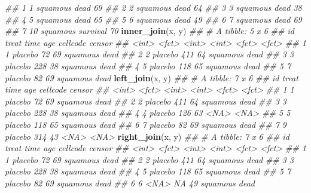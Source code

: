 \documentclass[
]{book}
\newenvironment{Shaded}{\begin{snugshade}}{\end{snugshade}}
\newcommand{\CommentTok}[1]{\textcolor[rgb]{0.56,0.35,0.01}{\textit{#1}}}
\newcommand{\KeywordTok}[1]{\textcolor[rgb]{0.13,0.29,0.53}{\textbf{#1}}}
\newcommand{\NormalTok}[1]{#1}
\begin{document}
\begin{Shaded}
\begin{Highlighting}[]
\CommentTok{\#\# 1     1 squamous dead        69}
\CommentTok{\#\# 2     2 squamous dead        64}
\CommentTok{\#\# 3     3 squamous dead        38}
\CommentTok{\#\# 4     5 squamous dead        65}
\CommentTok{\#\# 5     6 squamous dead        49}
\CommentTok{\#\# 6     7 squamous dead        69}
\CommentTok{\#\# 7    10 squamous survival    70}
\KeywordTok{inner\_join}\NormalTok{(x, y)}
\CommentTok{\#\# \# A tibble: 5 x 6}
\CommentTok{\#\#      id treat    time   age cellcode censor}
\CommentTok{\#\#   \textless{}int\textgreater{} \textless{}fct\textgreater{}   \textless{}int\textgreater{} \textless{}int\textgreater{} \textless{}fct\textgreater{}    \textless{}fct\textgreater{} }
\CommentTok{\#\# 1     1 placebo    72    69 squamous dead  }
\CommentTok{\#\# 2     2 placebo   411    64 squamous dead  }
\CommentTok{\#\# 3     3 placebo   228    38 squamous dead  }
\CommentTok{\#\# 4     5 placebo   118    65 squamous dead  }
\CommentTok{\#\# 5     7 placebo    82    69 squamous dead}
\KeywordTok{left\_join}\NormalTok{(x, y) }
\CommentTok{\#\# \# A tibble: 7 x 6}
\CommentTok{\#\#      id treat    time   age cellcode censor}
\CommentTok{\#\#   \textless{}int\textgreater{} \textless{}fct\textgreater{}   \textless{}int\textgreater{} \textless{}int\textgreater{} \textless{}fct\textgreater{}    \textless{}fct\textgreater{} }
\CommentTok{\#\# 1     1 placebo    72    69 squamous dead  }
\CommentTok{\#\# 2     2 placebo   411    64 squamous dead  }
\CommentTok{\#\# 3     3 placebo   228    38 squamous dead  }
\CommentTok{\#\# 4     4 placebo   126    63 \textless{}NA\textgreater{}     \textless{}NA\textgreater{}  }
\CommentTok{\#\# 5     5 placebo   118    65 squamous dead  }
\CommentTok{\#\# 6     7 placebo    82    69 squamous dead  }
\CommentTok{\#\# 7     9 placebo   314    43 \textless{}NA\textgreater{}     \textless{}NA\textgreater{}}
\KeywordTok{right\_join}\NormalTok{(x, y)}
\CommentTok{\#\# \# A tibble: 7 x 6}
\CommentTok{\#\#      id treat    time   age cellcode censor  }
\CommentTok{\#\#   \textless{}int\textgreater{} \textless{}fct\textgreater{}   \textless{}int\textgreater{} \textless{}int\textgreater{} \textless{}fct\textgreater{}    \textless{}fct\textgreater{}   }
\CommentTok{\#\# 1     1 placebo    72    69 squamous dead    }
\CommentTok{\#\# 2     2 placebo   411    64 squamous dead    }
\CommentTok{\#\# 3     3 placebo   228    38 squamous dead    }
\CommentTok{\#\# 4     5 placebo   118    65 squamous dead    }
\CommentTok{\#\# 5     7 placebo    82    69 squamous dead    }
\CommentTok{\#\# 6     6 \textless{}NA\textgreater{}       NA    49 squamous dead    }

\end{Highlighting}
\end{Shaded}
\end{document}
